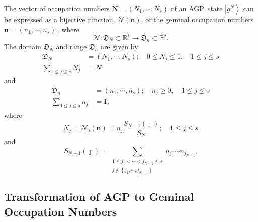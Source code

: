 \documentclass[aps,preprint]{revtex4}%
\begin{document}
The vector of occupation numbers $\mathbf{N}=\left(  N_{1},\cdots
,N_{s}\right)  $ of an AGP\ state $\left\vert g^{N}\right\rangle $ can be
expressed as a bijective function, $\mathcal{N}\left(  \mathbf{n}\right)  $,
of the geminal occupation numbers $\mathbf{n}=\left(  n_{1},\cdots
,n_{s}\right)  ,$ where
\begin{equation}
\mathcal{N}:\mathfrak{D}_{N}\subset\mathbb{R}^{s}\rightarrow\mathfrak{D}%
_{n}\subset\mathbb{R}^{s}.
\end{equation}
The domain $\mathfrak{D}_{N}$ and range $\mathfrak{D}_{n}$ are given by%
\begin{align}
\mathfrak{D}_{N}  &  =\left(  N_{1},\cdots,N_{s}\right)  ;\quad0\leq N_{j}%
\leq1,\quad1\leq j\leq s\nonumber\\
\sum_{1\leq j\leq s}N_{j}  &  =N
\end{align}
and
\begin{align}
\mathfrak{D}_{n}  &  =\left(  n_{1},\cdots,n_{s}\right)  ;\quad n_{j}%
\geq0,\quad1\leq j\leq s\nonumber\\
\sum_{1\leq j\leq s}n_{j}  &  =1,
\end{align}
where
\begin{equation}
N_{j}=\mathcal{N}_{j}\left(  \mathbf{n}\right)  =n_{j}\frac{S_{N-1}\left(
\jmath\right)  }{S_{N}};\quad1\leq j\leq s
\end{equation}
and
\begin{equation}
S_{N-1}\left(  \jmath\right)  =\sum_{\substack{1\leq j_{1}<\cdots<j_{N-1}\leq
s\\j\notin\left\{  j_{1},\cdots,j_{N-1}\right\}  }}n_{j_{1}}\cdots n_{j_{N-1}%
}.
\end{equation}


\subsection{Transformation of AGP to Geminal Occupation Numbers}
\end{document}
